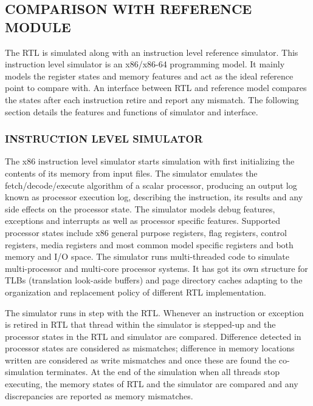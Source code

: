\subsection {COMPARISON WITH REFERENCE MODULE}

The RTL is simulated along with an instruction level reference simulator. This instruction level simulator is an x86/x86-64 programming model. It mainly models the register states and memory features and act as the ideal reference point to compare with. An interface between RTL and reference model compares the states after each instruction retire and report any mismatch. The following section details the features and functions of simulator and interface.

\subsubsection {INSTRUCTION LEVEL SIMULATOR}
The x86 instruction level simulator starts simulation with first initializing the contents of its memory from input files. The simulator emulates the fetch/decode/execute algorithm of a scalar processor, producing an output log known as processor execution log, describing the instruction, its results and any side effects on the processor state. The simulator models debug features, exceptions and interrupts as well as processor specific features. Supported processor states include x86 general purpose registers, flag registers, control registers, media registers and most common model specific registers and both memory and I/O space. The simulator runs multi-threaded code to simulate multi-processor and multi-core processor systems.  It has got its own structure for TLBs (translation look-aside buffers) and page directory caches adapting to the organization and replacement policy of different RTL implementation.
 
The simulator runs in step with the RTL. Whenever an instruction or exception is retired in RTL that thread within the simulator is stepped-up and the processor states in the RTL and simulator are compared. Difference detected in processor states are considered as mismatches; difference in memory locations written are considered as write mismatches and once these are found the co-simulation terminates. At the end of the simulation when all threads stop executing, the memory states of RTL and the simulator are compared and any discrepancies are reported as memory mismatches.

